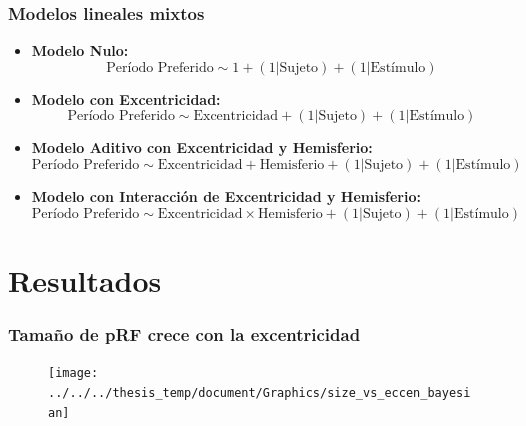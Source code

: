 \documentclass[
11pt, %
%
aspectratio=169, %
]{beamer}
\begin{document}
	\begin{frame}
		\frametitle{Modelos lineales mixtos}
		
		
			\begin{itemize}
				\item \textbf{Modelo Nulo:}	\\			
				\begin{equation}
					\text{Período Preferido} \sim 1 + (1 | \text{Sujeto}) + (1 | \text{Estímulo})	
					\label{m_1}
				\end{equation}
				
				\item\textbf{Modelo con Excentricidad:}\\			
				\begin{equation}
					\text{Período Preferido} \sim \text{Excentricidad} + (1 | \text{Sujeto}) + (1 | \text{Estímulo})	
					\label{m_2}
				\end{equation}
				
				\item \textbf{Modelo Aditivo con Excentricidad y Hemisferio:}\\				
				\begin{equation}
					\text{Período Preferido} \sim \text{Excentricidad} + \text{Hemisferio} + (1 | \text{Sujeto}) + (1 | \text{Estímulo})	
					\label{m_3}
				\end{equation}
			
				\item \textbf{Modelo con Interacci\'on de Excentricidad y Hemisferio:}\\				
				\begin{equation}
					\text{Período Preferido} \sim  \text{Excentricidad} \times \text{Hemisferio} + (1 | \text{Sujeto}) + (1 | \text{Estímulo})	
					\label{mlm_pp}
				\end{equation}
				
				
			\end{itemize}
		
		
	\end{frame}
	\section{Resultados}
	\begin{frame}
		\frametitle{Tama\~no de pRF crece con la excentricidad}
				
		\begin{figure}[h!]
			\centering
			\texttt{[image: ../../../thesis\_temp/document/Graphics/size\_vs\_eccen\_bayesian]}
		\end{figure}
		
	\end{frame}
	
\end{document}
